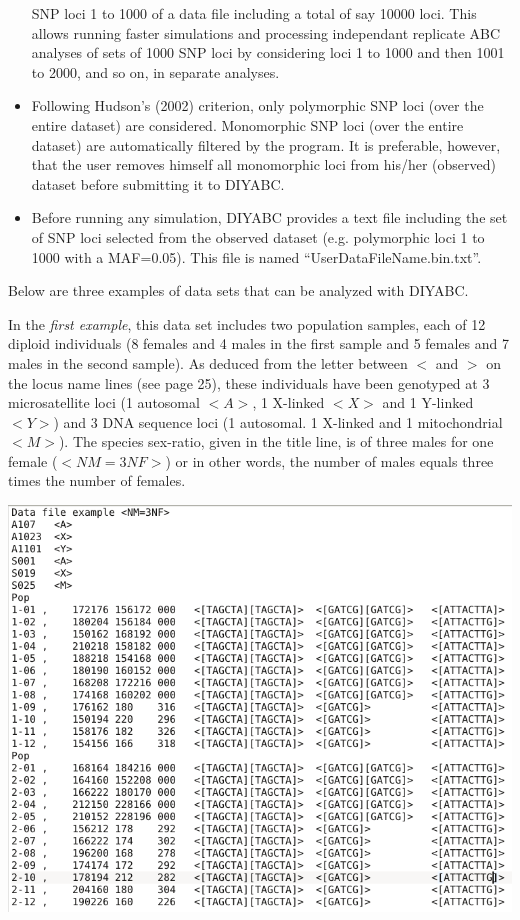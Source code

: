 \begin{itemize}
SNP loci 1 to 1000 of a data file including a total of say 10000 loci.
This allows running faster simulations and processing independant
replicate ABC analyses of sets of 1000 SNP loci by considering loci
1 to 1000 and then 1001 to 2000, and so on, in separate analyses.
\item Following Hudson's (2002) criterion, only polymorphic SNP loci (over
the entire dataset) are considered. Monomorphic SNP loci (over the
entire dataset) are automatically filtered by the program. It is preferable,
however, that the user removes himself all monomorphic loci from his/her
(observed) dataset before submitting it to DIYABC.
\item Before running any simulation, DIYABC provides a text file including
the set of SNP loci selected from the observed dataset (e.g. polymorphic
loci 1 to 1000 with a MAF=0.05). This file is named ``UserDataFileName.bin.txt''.
\end{itemize}
Below are three examples of data sets that can be analyzed with DIYABC.

In the \textit{first example}, this data set includes two population
samples, each of 12 diploid individuals (8 females and 4 males in
the first sample and 5 females and 7 males in the second sample).
As deduced from the letter between $<$ and $>$ on the locus name
lines (see page 25), these individuals have been genotyped at 3 microsatellite
loci (1 autosomal $<A>$, 1 X-linked $<X>$ and 1 Y-linked $<Y>$)
and 3 DNA sequence loci (1 autosomal. 1 X-linked and 1 mitochondrial
$<M>$). The species sex-ratio, given in the title line, is of three
males for one female ($<NM=3NF>$) or in other words, the number of
males equals three times the number of females.

\includegraphics[scale=0.6]{gui_pictures/screenga001}

